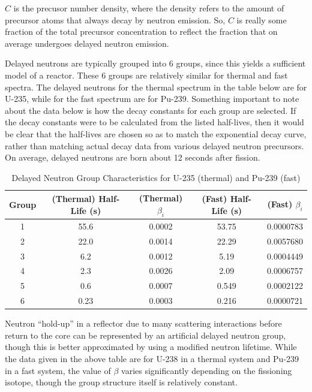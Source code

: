 \documentclass[10pt]{article}
\begin{document}
\begin{flushleft}
\(C\) is the precusor number density, where the density refers to the amount of precursor atoms that always decay by neutron emission. So, \(C\) is really some fraction of the total precursor concentration to reflect the fraction that on average undergoes delayed neutron emission. 

Delayed neutrons are typically grouped into 6 groups, since this yields a sufficient model of a reactor. These 6 groups are relatively similar for thermal and fast spectra. The delayed neutrons for the thermal spectrum in the table below are for U-235, while for the fast spectrum are for Pu-239. Something important to note about the data below is how the decay constants for each group are selected. If the decay constants were to be calculated from the listed half-lives, then it would be clear that the half-lives are chosen so as to match the exponential decay curve, rather than matching actual decay data from various delayed neutron precursors. On average, delayed neutrons are born about 12 seconds after fission. 

\begin{table}[h]
\caption{Delayed Neutron Group Characteristics for U-235 (thermal) and Pu-239 (fast)} %
\centering %
\begin{tabular}{c c c c c} %
\hline\hline %
 Group & (Thermal) Half-Life (s) & (Thermal) \(\beta_i\) & (Fast) Half-Life (s) & (Fast) \(\beta_i\)
\\ [0.5ex]
\hline %
1 & 55.6 & 0.0002 & 53.75 & 0.0000783\\
2 & 22.0 & 0.0014 & 22.29 & 0.0057680\\
3 & 6.2  & 0.0012 &  5.19 & 0.0004449\\
4 & 2.3  & 0.0026 &  2.09 & 0.0006757\\
5 & 0.6  & 0.0007 & 0.549 & 0.0002122\\
6 & 0.23 & 0.0003 & 0.216 & 0.0000721\\
\hline %
\end{tabular}
\label{tab:PPer}
\end{table}

Neutron ``hold-up'' in a reflector due to many scattering interactions before return to the core can be represented by an artificial delayed neutron group, though this is better approximated by using a modified neutron lifetime. While the data given in the above table are for U-238 in a thermal system and Pu-239 in a fast system, the value of \(\beta\) varies significantly depending on the fissioning isotope, though the group structure itself is relatively constant. 


\end{flushleft}
\end{document}
